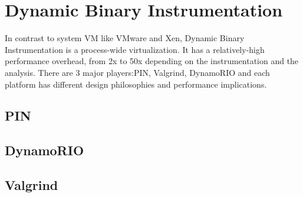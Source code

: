 \section{Dynamic Binary Instrumentation}
\label{sec:overview}
In contrast to system VM like VMware and Xen, Dynamic Binary Instrumentation is a process-wide virtualization. It has a relatively-high performance overhead, from 2x to 50x depending on the instrumentation and the analysis. There are 3 major players:PIN, Valgrind, DynamoRIO and each platform has different design philosophies and performance implications.
\subsection{PIN}
\subsection{DynamoRIO}
\subsection{Valgrind}
